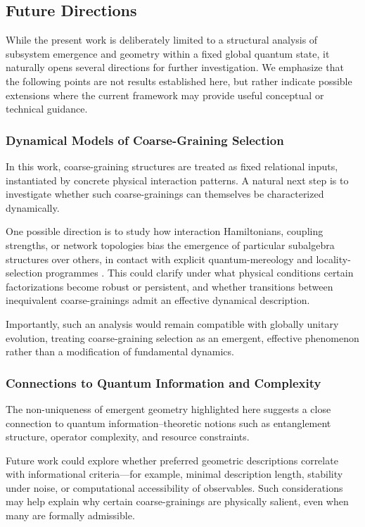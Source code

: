 \documentclass[12pt,a4paper]{article}
\begin{document}
\subsection{Future Directions}

While the present work is deliberately limited to a structural analysis of subsystem emergence and geometry within a fixed global quantum state, it naturally opens several directions for further investigation. 
We emphasize that the following points are not results established here, but rather indicate possible extensions where the current framework may provide useful conceptual or technical guidance.

\subsubsection{Dynamical Models of Coarse-Graining Selection}

In this work, coarse-graining structures are treated as fixed relational inputs, instantiated by concrete physical interaction patterns. 
A natural next step is to investigate whether such coarse-grainings can themselves be characterized dynamically.

One possible direction is to study how interaction Hamiltonians, coupling strengths, or network topologies bias the emergence of particular subalgebra structures over others, in contact with explicit quantum-mereology and locality-selection programmes \cite{Cotler2019,CarrollSingh2021}.
This could clarify under what physical conditions certain factorizations become robust or persistent, and whether transitions between inequivalent coarse-grainings admit an effective dynamical description.

Importantly, such an analysis would remain compatible with globally unitary evolution, treating coarse-graining selection as an emergent, effective phenomenon rather than a modification of fundamental dynamics.

\subsubsection{Connections to Quantum Information and Complexity}

The non-uniqueness of emergent geometry highlighted here suggests a close connection to quantum information--theoretic notions such as entanglement structure, operator complexity, and resource constraints.

Future work could explore whether preferred geometric descriptions correlate with informational criteria---for example, minimal description length, stability under noise, or computational accessibility of observables. 
Such considerations may help explain why certain coarse-grainings are physically salient, even when many are formally admissible.
\end{document}

